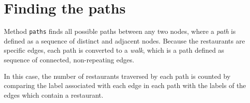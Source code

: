 \documentclass[
]{article}
\newenvironment{Shaded}{\begin{snugshade}}{\end{snugshade}}
\newcommand{\CommentTok}[1]{\textcolor[rgb]{0.56,0.35,0.01}{\textit{#1}}}
\newcommand{\ControlFlowTok}[1]{\textcolor[rgb]{0.13,0.29,0.53}{\textbf{#1}}}
\newcommand{\DecValTok}[1]{\textcolor[rgb]{0.00,0.00,0.81}{#1}}
\newcommand{\FunctionTok}[1]{\textcolor[rgb]{0.00,0.00,0.00}{#1}}
\newcommand{\NormalTok}[1]{#1}
\newcommand{\OtherTok}[1]{\textcolor[rgb]{0.56,0.35,0.01}{#1}}
\newcommand{\SpecialCharTok}[1]{\textcolor[rgb]{0.00,0.00,0.00}{#1}}
\newcommand{\StringTok}[1]{\textcolor[rgb]{0.31,0.60,0.02}{#1}}
\begin{document}
\hypertarget{finding-the-paths}{%
\section{Finding the paths}\label{finding-the-paths}}

Method \texttt{paths} finds all possible paths between any two nodes,
where a \emph{path} is defined as a sequence of distinct and adjacent
nodes. Because the restaurants are specific edges, each path is
converted to a \emph{walk}, which is a path defined as sequence of
connected, non-repeating edges.

In this case, the number of restaurants traversed by each path is
counted by comparing the label associated with each edge in each path
with the labels of the edges which contain a restaurant.

\begin{Shaded}
\end{Shaded}
\end{document}
